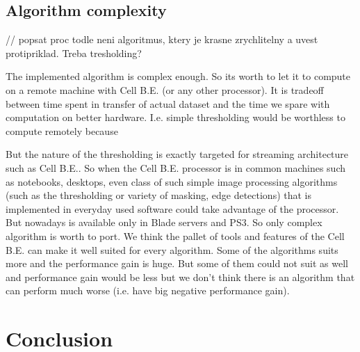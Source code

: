 \section{Algorithm complexity}
// popsat proc todle neni algoritmus, ktery je krasne zrychlitelny a uvest protipriklad. Treba tresholding?
\par
The implemented algorithm is complex enough.
So its worth to let it to compute on a remote machine with Cell B.E. (or any other processor).
It is tradeoff between time spent in transfer of actual dataset and the time we spare with computation on better hardware.
I.e. simple thresholding would be worthless to compute remotely because

But the nature of the thresholding is exactly targeted for streaming architecture such as Cell B.E..
So when the Cell B.E. processor is in common machines such as notebooks, desktops, even class of such simple image processing algorithms (such as the thresholding or variety of masking, edge detections) that is implemented in everyday used software could take advantage of the processor.
But nowadays is available only in Blade servers and PS3.
So only complex algorithm is worth to port.
We think the pallet of tools and features of the Cell B.E. can make it well suited for every algorithm.
Some of the algorithms suits more and the performance gain is huge.
But some of them could not suit as well and performance gain would be less but we don't think there is an algorithm that can perform much worse (i.e. have big negative performance gain).

\chapter{Conclusion}

